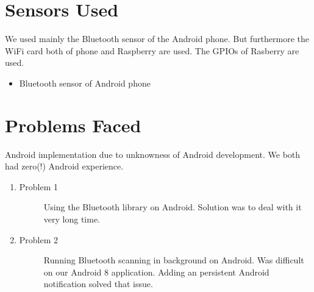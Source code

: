 \documentclass[
10pt, %
a4paper, %
oneside, %
headinclude,footinclude, %
BCOR5mm, %
]{scrartcl}
\begin{document}
\section{Sensors Used}
We used mainly the Bluetooth sensor of the Android phone. But furthermore the WiFi card both of phone and Raspberry are used. The GPIOs of Rasberry are used.

\begin{itemize}
\item Bluetooth sensor of Android phone
\end{itemize}


\section{Problems Faced}
Android implementation due to unknowness of Android development. We both had zero(!) Android experience.

\begin{enumerate}
\item 
	\begin{description}
	\item[Problem 1] Using the Bluetooth library on Android. Solution was to deal with it very long time.
	\end{description}
	\item 
	\begin{description}
	\item[Problem 2] Running Bluetooth scanning in background on Android. Was difficult on our Android 8 application. Adding an persistent Android notification solved that issue.
	\end{description}
\end{enumerate}
\end{document}
